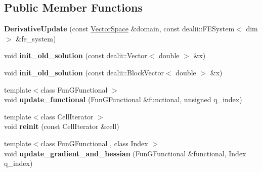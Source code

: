 \subsection*{Public Member Functions}
\begin{DoxyCompactItemize}
\item 
\hypertarget{structSpacy_1_1dealII_1_1Detail_1_1DerivativeUpdate_a5e5875c13ea3b0d21267f69b41360f99}{{\bfseries Derivative\-Update} (const \hyperlink{classSpacy_1_1VectorSpace}{Vector\-Space} \&domain, const dealii\-::\-F\-E\-System$<$ dim $>$ \&fe\-\_\-system)}\label{structSpacy_1_1dealII_1_1Detail_1_1DerivativeUpdate_a5e5875c13ea3b0d21267f69b41360f99}

\item 
\hypertarget{structSpacy_1_1dealII_1_1Detail_1_1DerivativeUpdate_ae7be444fc13fe4dc1f164ba653d318d9}{void {\bfseries init\-\_\-old\-\_\-solution} (const dealii\-::\-Vector$<$ double $>$ \&x)}\label{structSpacy_1_1dealII_1_1Detail_1_1DerivativeUpdate_ae7be444fc13fe4dc1f164ba653d318d9}

\item 
\hypertarget{structSpacy_1_1dealII_1_1Detail_1_1DerivativeUpdate_a12ebc4571dfcb472a6496f4aec53f1ba}{void {\bfseries init\-\_\-old\-\_\-solution} (const dealii\-::\-Block\-Vector$<$ double $>$ \&x)}\label{structSpacy_1_1dealII_1_1Detail_1_1DerivativeUpdate_a12ebc4571dfcb472a6496f4aec53f1ba}

\item 
\hypertarget{structSpacy_1_1dealII_1_1Detail_1_1DerivativeUpdate_a1e138fc587720c3bb302134902b4a2e9}{{\footnotesize template$<$class Fun\-G\-Functional $>$ }\\void {\bfseries update\-\_\-functional} (Fun\-G\-Functional \&functional, unsigned q\-\_\-index)}\label{structSpacy_1_1dealII_1_1Detail_1_1DerivativeUpdate_a1e138fc587720c3bb302134902b4a2e9}

\item 
\hypertarget{structSpacy_1_1dealII_1_1Detail_1_1DerivativeUpdate_a60879d22f8b2e4d9327e4df5866a5d51}{{\footnotesize template$<$class Cell\-Iterator $>$ }\\void {\bfseries reinit} (const Cell\-Iterator \&cell)}\label{structSpacy_1_1dealII_1_1Detail_1_1DerivativeUpdate_a60879d22f8b2e4d9327e4df5866a5d51}

\item 
\hypertarget{structSpacy_1_1dealII_1_1Detail_1_1DerivativeUpdate_a8f1ee8a665b9b7c429c8179e501e57a9}{{\footnotesize template$<$class Fun\-G\-Functional , class Index $>$ }\\void {\bfseries update\-\_\-gradient\-\_\-and\-\_\-hessian} (Fun\-G\-Functional \&functional, Index q\-\_\-index)}\label{structSpacy_1_1dealII_1_1Detail_1_1DerivativeUpdate_a8f1ee8a665b9b7c429c8179e501e57a9}


\end{DoxyCompactItemize}
